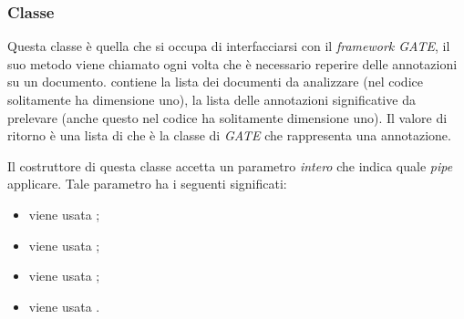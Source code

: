 \documentclass[tesi.tex]{subfiles}
\begin{document}
\subsubsection{Classe }
\begin{center}
\end{center}
Questa classe \`e quella che si occupa di interfacciarsi con il
\emph{framework GATE}, il suo metodo 
viene chiamato ogni volta che \`e necessario reperire delle
annotazioni su un documento.  contiene la lista dei
documenti da analizzare (nel codice solitamente ha dimensione uno),
 la lista delle annotazioni significative da
prelevare (anche questo nel codice ha solitamente dimensione uno). Il
valore di ritorno \`e una lista di  che \`e la
classe di \emph{GATE} che rappresenta una annotazione.

Il costruttore di questa classe accetta un parametro \emph{intero} che
indica quale \emph{pipe} applicare. Tale parametro ha i seguenti
significati:
\begin{itemize}
\item {} viene usata ;
\item {} viene usata ;
\item {} viene usata ;
\item {} viene usata .
\end{itemize}
\end{document}
